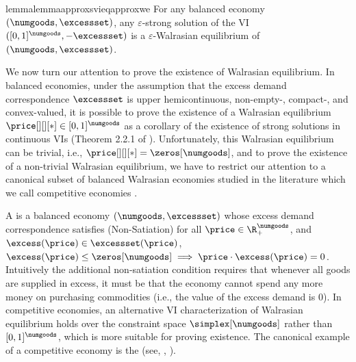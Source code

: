 \begin{restatable}{lemma}{lemmaapproxsvieqapproxwe}\label{lemma:approx_svi_eq_approx_we}
    For any balanced economy $(\numgoods, \excessset)$, any $\varepsilon$-strong solution of the VI $([0, 1]^\numgoods, -\excessset)$ is a $\varepsilon$-Walrasian equilibrium of $(\numgoods, \excessset)$. 
\end{restatable}

We now turn our attention to prove the existence of Walrasian equilibrium. In balanced economies, under the assumption that the excess demand correspondence $\excessset$ is upper hemicontinuous, non-empty-, compact-, and convex-valued, it is possible to prove the existence of a Walrasian equilibrium $\price[][][*] \in [0, 1]^\numgoods$ as a corollary of the existence of strong solutions in continuous VIs (Theorem 2.2.1 of \citet{facchinei2003finite}). 
% 
Unfortunately, this Walrasian equilibrium can be trivial, i.e.,  $\price[][][*] = \zeros[\numgoods]$, and to prove the existence of a non-trivial Walrasian equilibrium, we have to restrict our attention to a canonical subset of balanced Walrasian economies studied in the literature which we call competitive economies \cite{debreu1974excess, sonnenschein1972market}. 

A  is a balanced economy $(\numgoods, \excessset)$ whose excess demand correspondence satisfies (Non-Satiation) for all $\price \in \R^\numgoods_+$, and $\excess(\price) \in \excessset(\price)$, $\excess(\price) \leq \zeros[\numgoods] \implies \price \cdot \excess(\price) = 0$. Intuitively the additional non-satiation condition requires that whenever all goods are supplied in excess, it must be that the economy cannot spend any more money on purchasing commodities (i.e., the value of the excess demand is 0). 
In competitive economies, an alternative VI characterization of Walrasian equilibrium holds over the constraint space $\simplex[\numgoods]$ rather than $[0, 1]^\numgoods$, which is more suitable for proving existence. The canonical example of a competitive economy is the  \cite{arrow-debreu} (see, , ).

